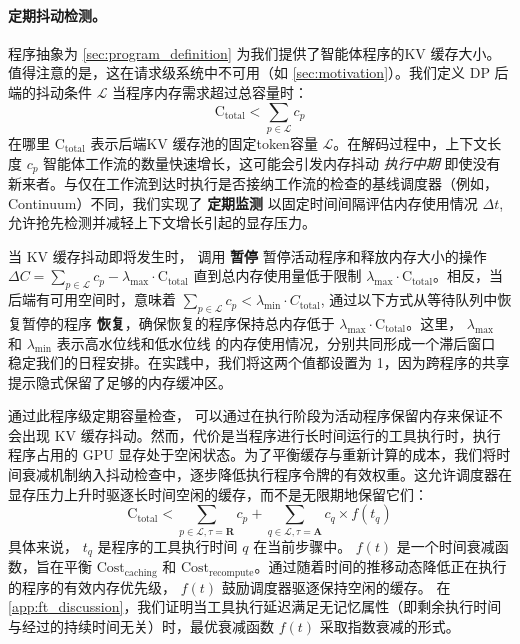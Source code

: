\paragraph{定期抖动检测。}  程序抽象为 \autoref{sec:program_definition} 为我们提供了智能体程序的KV 缓存大小。值得注意的是，这在请求级系统中不可用（如 \autoref{sec:motivation}）。我们定义 DP 后端的抖动条件 $\mathcal{L}$ 当程序内存需求超过总容量时：
\begin{equation}
    \text{C}_{\text{total}} < \sum_{p \in \mathcal{L}} c_p
\end{equation}
\noindent 在哪里 $\text{C}_{\text{total}}$ 表示后端KV 缓存池的固定token容量 $\mathcal{L}$。在解码过程中，上下文长度 $c_p$ 智能体工作流的数量快速增长，这可能会引发内存抖动 \emph{执行中期} 即使没有新来者。与仅在工作流到达时执行是否接纳工作流的检查的基线调度器（例如，Continuum）不同，我们实现了 \textbf{定期监测} 以固定时间间隔评估内存使用情况 $\Delta t$, \mbox{允许抢先检测并减轻上下文增长引起的显存压力。}

当 KV 缓存抖动即将发生时， \ouralg 调用 \textbf{暂停} 暂停活动程序和释放内存大小的操作 $\Delta C = \sum_{p \in \mathcal{L}} c_p - \lambda_{\max} \cdot \text{C}_{\text{total}}$ 直到总内存使用量低于限制 $\lambda_{\max} \cdot \text{C}_{\text{total}}$。相反，当后端有可用空间时，意味着
$\sum_{p \in \mathcal{L}} c_p < \lambda_{\min} \cdot C_{\text{total}}$, \ouralg 通过以下方式从等待队列中恢复暂停的程序 \textbf{恢复}，确保恢复的程序保持总内存低于 $\lambda_{\max} \cdot \text{C}_{\text{total}}$。这里， $\lambda_{\max}$ 和 $\lambda_{\min}$ 表示高水位线和低水位线
的内存使用情况，分别共同形成一个滞后窗口
稳定我们的日程安排。在实践中，我们将这两个值都设置为 1，因为跨程序的共享提示隐式保留了足够的内存缓冲区。

通过此程序级定期容量检查， \ouralg 可以通过在执行阶段为活动程序保留内存来保证不会出现 KV 缓存抖动。然而，代价是当程序进行长时间运行的工具执行时，执行程序占用的 GPU 显存处于空闲状态。为了平衡缓存与重新计算的成本，我们将时间衰减机制纳入抖动检查中，逐步降低执行程序令牌的有效权重。这允许调度器在显存压力上升时驱逐长时间空闲的缓存，而不是无限期地保留它们：
\begin{equation}
\label{eq:time_decay}
    \text{C}_{\text{total}} < \sum_{p \in \mathcal{L},\tau = \textbf{R}} c_p +\sum_{q \in \mathcal{L},\tau = \textbf{A}} c_q \times f(t_q)
\end{equation}
具体来说， $t_q$ 是程序的工具执行时间 $q$ 在当前步骤中。 $f(t)$ 是一个时间衰减函数，旨在平衡 $\text{Cost}_{\text{caching}}$ 和 $\text{Cost}_{\text{recompute}}$。通过随着时间的推移动态降低正在执行的程序的有效内存优先级， $f(t)$ 鼓励调度器驱逐保持空闲的缓存。
在 \autoref{app:ft_discussion}，我们证明当工具执行延迟满足无记忆属性（即剩余执行时间与经过的持续时间无关）时，最优衰减函数 $f(t)$ 采取指数衰减的形式。

